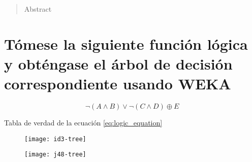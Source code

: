 \documentclass[10pt, a4paper,spanish]{article}
\begin{document}
	\maketitle %

	\thispagestyle{fancy} %



	\begin{abstract}
		\noindent Abstract
	\end{abstract}



  \section{Tómese la siguiente función lógica y obténgase el árbol de decisión correspondiente usando WEKA}

		\begin{equation}
			\label{eq:logic_equation}
			\neg(A \land B) \lor \neg(C \land D) \oplus E
		\end{equation}

		\begin{table}[p]
			\begin{center}
			\end{center}
			\caption{Tabla de verdad de la ecuación \ref{eq:logic_equation}}
			\label{eq:truth_table}
		\end{table}


		\begin{figure}[h]
			\begin{center}
				\texttt{[image: id3-tree]}
			\end{center}
			\caption{}
			\label{}
		\end{figure}

		\begin{figure}[h]
			\begin{center}
				\texttt{[image: j48-tree]}
			\end{center}
			\caption{}
			\label{}
		\end{figure}
\end{document}
